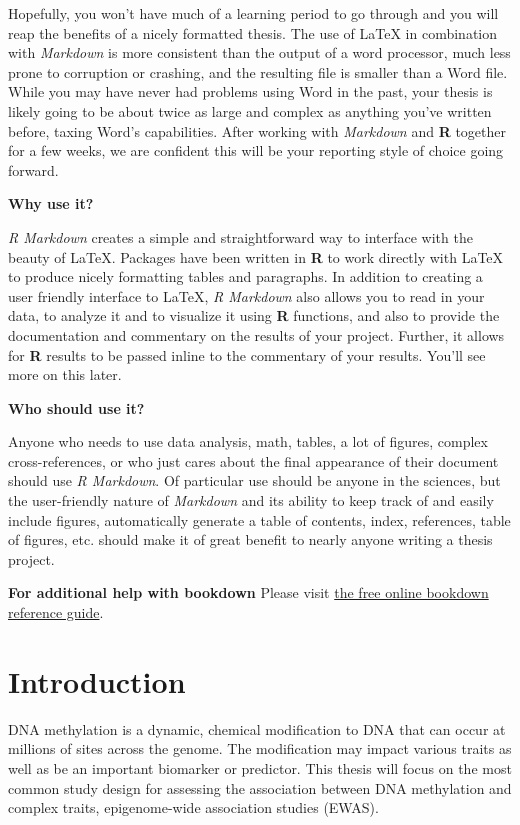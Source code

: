 \documentclass[11pt,twoside]{bristolthesis}
\begin{document}
Hopefully, you won't have much of a learning period to go through and you will reap the benefits of a nicely formatted thesis. The use of LaTeX in combination with \emph{Markdown} is more consistent than the output of a word processor, much less prone to corruption or crashing, and the resulting file is smaller than a Word file. While you may have never had problems using Word in the past, your thesis is likely going to be about twice as large and complex as anything you've written before, taxing Word's capabilities. After working with \emph{Markdown} and \textbf{R} together for a few weeks, we are confident this will be your reporting style of choice going forward.

\textbf{Why use it?}

\emph{R Markdown} creates a simple and straightforward way to interface with the beauty of LaTeX. Packages have been written in \textbf{R} to work directly with LaTeX to produce nicely formatting tables and paragraphs. In addition to creating a user friendly interface to LaTeX, \emph{R Markdown} also allows you to read in your data, to analyze it and to visualize it using \textbf{R} functions, and also to provide the documentation and commentary on the results of your project. Further, it allows for \textbf{R} results to be passed inline to the commentary of your results. You'll see more on this later.

\textbf{Who should use it?}

Anyone who needs to use data analysis, math, tables, a lot of figures, complex cross-references, or who just cares about the final appearance of their document should use \emph{R Markdown}. Of particular use should be anyone in the sciences, but the user-friendly nature of \emph{Markdown} and its ability to keep track of and easily include figures, automatically generate a table of contents, index, references, table of figures, etc. should make it of great benefit to nearly anyone writing a thesis project.

\textbf{For additional help with bookdown}
Please visit \href{https://bookdown.org/yihui/bookdown/}{the free online bookdown reference guide}.

\hypertarget{introduction}{%
\chapter{Introduction}\label{introduction}}

DNA methylation is a dynamic, chemical modification to DNA that can occur at millions of sites across the genome. The modification may impact various traits as well as be an important biomarker or predictor. This thesis will focus on the most common study design for assessing the association between DNA methylation and complex traits, epigenome-wide association studies (EWAS).
\end{document}
